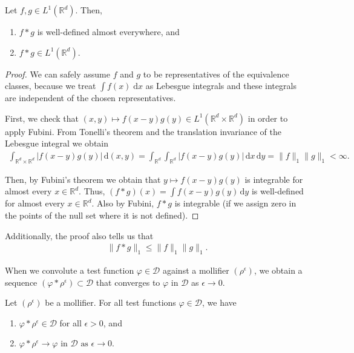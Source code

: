 \begin{lemma}
    Let $f,g \in {L}^1(\mathbb{R}^d)$. Then, 
    \begin{enumerate}
        \item $f*g$ is well-defined almost everywhere, and 
        \item $f*g \in {L}^1(\mathbb{R}^d)$.
    \end{enumerate}
\end{lemma}
\begin{proof}
    We can safely assume $f$ and $g$ to be representatives of the equivalence classes, because we  treat $\int f(x) \; \mathrm{d}x$ as Lebesgue integrals and these integrals are independent of the chosen representatives.

    First, we check that $(x,y) \mapsto f(x-y)g(y) \in L^1(\mathbb{R}^d \times \mathbb{R}^d)$ in order to apply Fubini. From Tonelli's theorem and the translation invariance of the Lebesgue integral we obtain
    \begin{align*}
        \int_{\mathbb{R}^d \times \mathbb{R}^d}|f(x-y)g(y)| \, \mathrm{d}(x,y) = \int_{\mathbb{R}^d}\int_{\mathbb{R}^d} |f(x-y)g(y)| \, \mathrm{d}x \, \mathrm{d}y = \lVert f \rVert_{1} \lVert g \rVert_{1} < \infty.
    \end{align*}

    Then, by Fubini's theorem we obtain that $y \mapsto f(x-y)g(y)$ is integrable for almost every $x \in \mathbb{R}^d$. Thus, $(f*g)(x) = \int f(x-y)g(y) \, \mathrm{d}y$ is well-defined for almost every $x \in \mathbb{R}^d$. Also by Fubini, $f*g$ is integrable (if we assign zero in the points of the null set where it is not defined).
\end{proof}
Additionally, the proof also tells us that
\begin{align}
    \lVert f*g \rVert_1 \leq \lVert f \rVert_{1} \lVert g \rVert_{1}.
\end{align}

When we convolute a test function $\varphi \in \mathcal{D}$ against a mollifier $(\rho^\epsilon)$, we obtain a sequence $(\varphi * \rho^\epsilon) \subset \mathcal{D}$ that converges to $\varphi$ in $\mathcal{D}$ as $\epsilon \to 0$.  

\begin{lemma}\label{mollifier-lemma}
    Let $(\rho^\epsilon)$ be a mollifier. For all test functions $\varphi \in \mathcal{D}$, we have
    \begin{enumerate}
        \item $\varphi * \rho^{\epsilon} \in \mathcal{D}$ for all $\epsilon > 0$, and
 
        \item $\varphi * \rho^\epsilon \to \varphi  \text{ in $\mathcal{D}$ as $\epsilon \to 0$}$.
    \end{enumerate}
\end{lemma}

